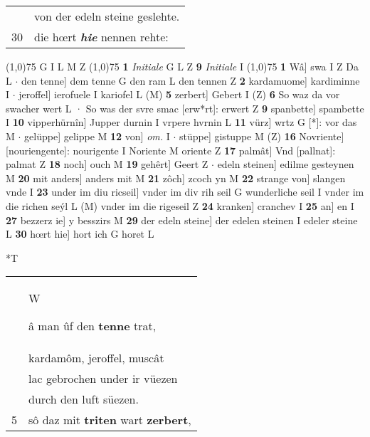 \documentclass[8pt,a4paper,notitlepage]{article}
\begin{document}
\begin{table}[ht]
\begin{minipage}[t]{0.5\linewidth}
\begin{tabular}{rl}
 & von der edeln steine geslehte.\\ 
30 & die hœrt \textit{\textbf{hie}} nennen rehte:\\ 
\end{tabular}
\scriptsize
\line(1,0){75} \newline
G I L M Z \newline
\line(1,0){75} \newline
\textbf{1} \textit{Initiale} G L Z  \textbf{9} \textit{Initiale} I  \newline
\line(1,0){75} \newline
\textbf{1} Wâ] swa I Z Da L  $\cdot$ den tenne] dem tenne G den ram L den tennen Z \textbf{2} kardamuome] kardiminne I  $\cdot$ jeroffel] ierofuele I kariofel L (M) \textbf{5} zerbert] Gebert I (Z) \textbf{6} So waz da vor swacher wert L · So was der svre smac [erw*rt]: erwert Z \textbf{9} spanbette] spambette I \textbf{10} vipperhürnîn] Jupper durnin I vrpere hvrnin L \textbf{11} vürz] wrtz G [*]: vor das M  $\cdot$ gelüppe] gelippe M \textbf{12} von] \textit{om.} I  $\cdot$ stüppe] gistuppe M (Z) \textbf{16} Novriente] [nouriengente]: nourigente I Noriente M oriente Z \textbf{17} palmât] Vnd [pallnat]: palmat Z \textbf{18} noch] ouch M \textbf{19} gehêrt] Geert Z  $\cdot$ edeln steinen] edilme gesteynen M \textbf{20} mit anders] anders mit M \textbf{21} zôch] zcoch yn M \textbf{22} strange von] slangen vnde I \textbf{23} under im diu ricseil] vnder im div rih seil G wunderliche seil I vnder im die richen seýl L (M) vnder im die rigeseil Z \textbf{24} kranken] cranchev I \textbf{25} an] en I \textbf{27} bezzerz ie] y besszirs M \textbf{29} der edeln steine] der edelen steinen I edeler steine L \textbf{30} hœrt hie] hort ich G horet L \newline
\end{minipage}
\hspace{0.5cm}
\begin{minipage}[t]{0.5\linewidth}
\small
\begin{center}*T
\end{center}
\begin{tabular}{rl}
 & \begin{large}W\end{large}â man ûf den \textbf{tenne} trat,\\ 
 & kardamôm, jeroffel, muscât\\ 
 & lac gebrochen under ir vüezen\\ 
 & durch den luft süezen.\\ 
5 & sô daz mit \textbf{triten} wart \textbf{zerbert},\\ 

\end{tabular}
\end{minipage}
\end{table}
\end{document}
